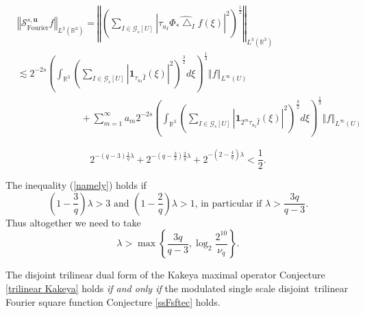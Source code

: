 \documentclass[10pt,a4paper]{amsart}
\begin{document}
\begin{align}
&  \left\Vert \mathcal{S}_{\operatorname*{Fourier}}^{s,\mathbf{u}}f\right\Vert
_{L^{3}\left(  \mathbb{R}^{3}\right)  }=\left\Vert \left(  \sum_{I\in
\mathcal{G}_{s}\left[  U\right]  }\left\vert \tau_{u_{I}}\widehat{\Phi_{\ast
}\bigtriangleup_{I}f}\left(  \xi\right)  \right\vert ^{2}\right)  ^{\frac
{1}{2}}\right\Vert _{L^{3}\left(  \mathbb{R}^{3}\right)  }\label{rap}\\
&  \lesssim2^{-2s}\left(  \int_{\mathbb{R}^{3}}\left(  \sum_{I\in
\mathcal{G}_{s}\left[  U\right]  }\left\vert \mathbf{1}_{\tau_{u_{I}}%
\widehat{I}}\left(  \xi\right)  \right\vert ^{2}\right)  ^{\frac{3}{2}}%
d\xi\right)  ^{\frac{1}{3}}\left\Vert f\right\Vert _{L^{\infty}\left(
U\right)  }\nonumber\\
&  \ \ \ \ \ \ \ \ \ \ \ \ \ \ \ \ \ \ \ \ \ \ \ \ \ \ \ \ \ \ +\sum
_{m=1}^{\infty}a_{m}2^{-2s}\left(  \int_{\mathbb{R}^{3}}\left(  \sum
_{I\in\mathcal{G}_{s}\left[  U\right]  }\left\vert \mathbf{1}_{2^{m}%
\tau_{u_{I}}\widehat{I}}\left(  \xi\right)  \right\vert ^{2}\right)
^{\frac{3}{2}}d\xi\right)  ^{\frac{1}{3}}\left\Vert f\right\Vert _{L^{\infty
}\left(  U\right)  }\nonumber
\end{align}

\begin{equation}
2^{-\left(  q-3\right)  \frac{1}{q}\lambda}+2^{-\left(  q-\frac{3}{2}\right)
\frac{2}{q}\lambda}+2^{-\left(  2-\frac{4}{q}\right)  \lambda}<\frac{1}{2}.
\label{namely}%
\end{equation}

\begin{remark}
\label{param}The inequality (\ref{namely}) holds if
\[
\left(  1-\frac{3}{q}\right)  \lambda>3\text{ and }\left(  1-\frac{2}%
{q}\right)  \lambda>1\text{, in particular if }\lambda>\frac{3q}{q-3}.
\]
Thus altogether we need to take%
\[
\lambda>\max\left\{  \frac{3q}{q-3},\log_{2}\frac{2^{10}}{\nu_{q}}\right\}  .
\]

\end{remark}

\begin{proposition}
\label{Kak tri equiv}The disjoint trilinear dual form of the Kakeya maximal
operator Conjecture \ref{trilinear Kakeya} holds \emph{if and only if} the
modulated single scale disjoint\emph{\ }trilinear Fourier square function
Conjecture \ref{ssFsftec} holds.
\end{proposition}
\end{document}
